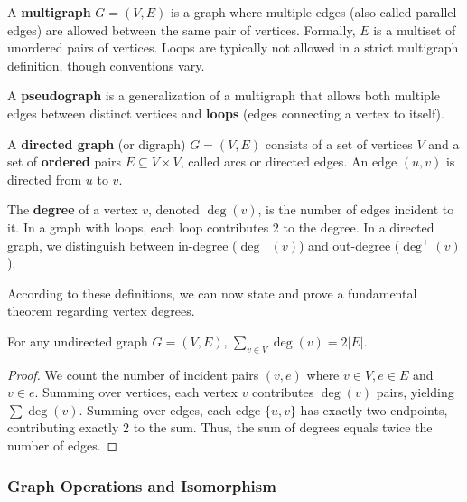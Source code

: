 \begin{definition}[Multigraph]
A \textbf{multigraph} $G = (V, E)$ is a graph where multiple edges (also called parallel edges) are allowed between the same pair of vertices. Formally, $E$ is a multiset of unordered pairs of vertices. Loops are typically not allowed in a strict multigraph definition, though conventions vary.
\end{definition}

\begin{definition}[Pseudograph]
A \textbf{pseudograph} is a generalization of a multigraph that allows both multiple edges between distinct vertices and \textbf{loops} (edges connecting a vertex to itself).
\end{definition}

\begin{definition}
A \textbf{directed graph} (or digraph) $G = (V, E)$ consists of a set of vertices $V$ and a set of \textbf{ordered} pairs $E \subseteq V \times V$, called arcs or directed edges. An edge $(u, v)$ is directed from $u$ to $v$.
\end{definition}

\begin{definition}[Degree]
The \textbf{degree} of a vertex $v$, denoted $\deg(v)$, is the number of edges incident to it. In a graph with loops, each loop contributes 2 to the degree. In a directed graph, we distinguish between in-degree ($\deg^-(v)$) and out-degree ($\deg^+(v)$).
\end{definition}

According to these definitions, we can now state and prove a fundamental theorem regarding vertex degrees.

\begin{theorem}
For any undirected graph $G = (V, E)$, $\sum_{v \in V} \deg(v) = 2|E|$.
\end{theorem}
\begin{proof}
We count the number of incident pairs $(v, e)$ where $v \in V, e \in E$ and $v \in e$.
Summing over vertices, each vertex $v$ contributes $\deg(v)$ pairs, yielding $\sum \deg(v)$.
Summing over edges, each edge $\{u, v\}$ has exactly two endpoints, contributing exactly 2 to the sum.
Thus, the sum of degrees equals twice the number of edges.
\end{proof}

\subsubsection{Graph Operations and Isomorphism}

